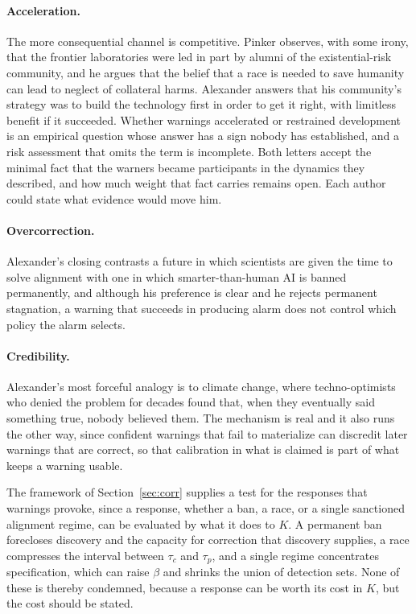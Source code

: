 \documentclass[11pt]{article}
\begin{document}
\paragraph{Acceleration.} The more consequential channel is competitive. Pinker observes, with some irony, that the frontier laboratories were led in part by alumni of the existential-risk community, and he argues that the belief that a race is needed to save humanity can lead to neglect of collateral harms. Alexander answers that his community's strategy was to build the technology first in order to get it right, with limitless benefit if it succeeded. Whether warnings accelerated or restrained development is an empirical question whose answer has a sign nobody has established, and a risk assessment that omits the term is incomplete. Both letters accept the minimal fact that the warners became participants in the dynamics they described, and how much weight that fact carries remains open. Each author could state what evidence would move him.

\paragraph{Overcorrection.} Alexander's closing contrasts a future in which scientists are given the time to solve alignment with one in which smarter-than-human AI is banned permanently, and although his preference is clear and he rejects permanent stagnation, a warning that succeeds in producing alarm does not control which policy the alarm selects.

\paragraph{Credibility.} Alexander's most forceful analogy is to climate change, where techno-optimists who denied the problem for decades found that, when they eventually said something true, nobody believed them. The mechanism is real and it also runs the other way, since confident warnings that fail to materialize can discredit later warnings that are correct, so that calibration in what is claimed is part of what keeps a warning usable.

The framework of Section~\ref{sec:corr} supplies a test for the responses that warnings provoke, since a response, whether a ban, a race, or a single sanctioned alignment regime, can be evaluated by what it does to $K$. A permanent ban forecloses discovery and the capacity for correction that discovery supplies, a race compresses the interval between $\tau_c$ and $\tau_p$, and a single regime concentrates specification, which can raise $\beta$ and shrinks the union of detection sets. None of these is thereby condemned, because a response can be worth its cost in $K$, but the cost should be stated.
\end{document}
